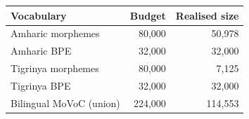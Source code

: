 \begin{tabular}{lrr}
\toprule
Vocabulary & Budget & Realised size \\
\midrule
Amharic morphemes & 80,000 & 50,978 \\
Amharic BPE & 32,000 & 32,000 \\
Tigrinya morphemes & 80,000 & 7,125 \\
Tigrinya BPE & 32,000 & 32,000 \\
Bilingual MoVoC (union) & 224,000 & 114,553 \\
\bottomrule
\end{tabular}
